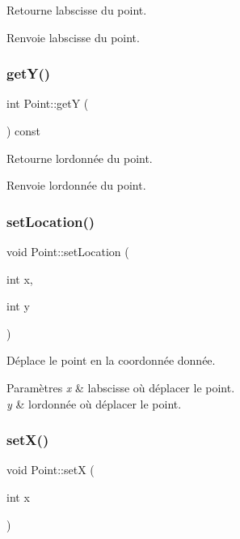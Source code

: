 Retourne l\textquotesingle{}abscisse du point. \begin{DoxyReturn}{Renvoie}
l\textquotesingle{}abscisse du point. 
\end{DoxyReturn}
\mbox{\label{class_point_a86d10ff46e08462c45b15a8c7ef62d61}} 
\subsubsection{\texorpdfstring{getY()}{getY()}}
{\footnotesize\ttfamily int Point\+::getY (\begin{DoxyParamCaption}{ }\end{DoxyParamCaption}) const}

Retourne l\textquotesingle{}ordonnée du point. \begin{DoxyReturn}{Renvoie}
l\textquotesingle{}ordonnée du point. 
\end{DoxyReturn}
\mbox{\label{class_point_ad5250aac5c650853f63942b180f3c8a6}} 
\subsubsection{\texorpdfstring{setLocation()}{setLocation()}}
{\footnotesize\ttfamily void Point\+::set\+Location (\begin{DoxyParamCaption}\item[{int}]{x,  }\item[{int}]{y }\end{DoxyParamCaption})}

Déplace le point en la coordonnée donnée. 
\begin{DoxyParams}{Paramètres}
{\em x} & l\textquotesingle{}abscisse où déplacer le point. \\
\hline
{\em y} & l\textquotesingle{}ordonnée où déplacer le point. \\
\hline
\end{DoxyParams}
\mbox{\label{class_point_acdc86ab607b2ae8415152883e2629015}} 
\subsubsection{\texorpdfstring{setX()}{setX()}}
{\footnotesize\ttfamily void Point\+::setX (\begin{DoxyParamCaption}\item[{int}]{x }\end{DoxyParamCaption})}

